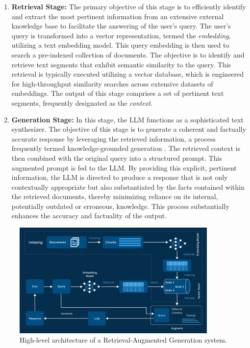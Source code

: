 \begin{enumerate}
    \item \textbf{Retrieval Stage:} The primary objective of this stage is to efficiently identify and extract the most pertinent information from an extensive external knowledge base to facilitate the answering of the user's query. The user's query is transformed into a vector representation, termed the \textit{embedding}, utilizing a text embedding model. This query embedding is then used to search a pre-indexed collection of documents. The objective is to identify and retrieve text segments that exhibit semantic similarity to the query. This retrieval is typically executed utilizing a vector database, which is engineered for high-throughput similarity searches across extensive datasets of embeddings. The output of this stage comprises a set of pertinent text segments, frequently designated as the \textit{context}.

    
    \item \textbf{Generation Stage:} In this stage, the LLM functions as a sophisticated text synthesizer. The objective of this stage is to generate a coherent and factually accurate response by leveraging the retrieved information, a process frequently termed knowledge-grounded generation \autocite{yu2022survey}. The retrieved context is then combined with the original query into a structured prompt. This augmented prompt is fed to the LLM. By providing this explicit, pertinent information, the LLM is directed to produce a response that is not only contextually appropriate but also substantiated by the facts contained within the retrieved documents, thereby minimizing reliance on its internal, potentially outdated or erroneous, knowledge. This process substantially enhances the accuracy and factuality of the output.
\end{enumerate}

\begin{figure}[!htbp]
    \centering
    \includegraphics[width=0.9\textwidth]{images/chapter2/rag_architecture_2.png}
    \caption{High-level architecture of a Retrieval-Augmented Generation system.}
    \label{fig:rag_architecture}
\end{figure}

